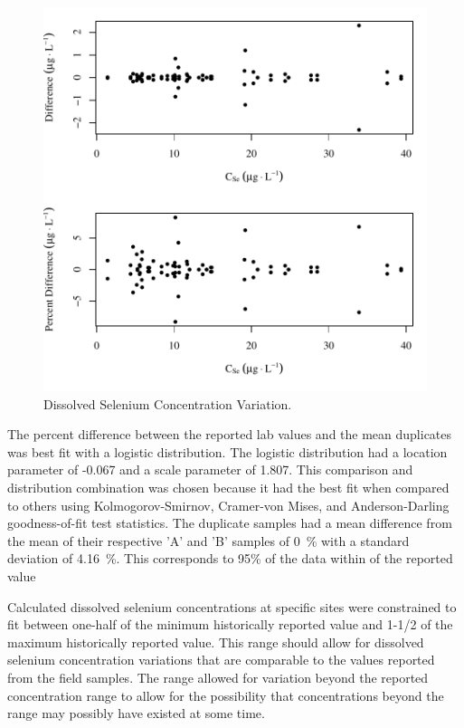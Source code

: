 \begin{linenumbers}
\begin{figure}[htbp]
	\begin{center}
		\includegraphics[width=6in]{"Figures/Results_USR/Stochastic/CSe Error Scatter"}
		\caption[Dissolved Selenium Concentration Variation]{Dissolved Selenium Concentration Variation.}
		\label{fig:CSe uncertainty scatter}
	\end{center}
\end{figure}

The percent difference between the reported lab values and the mean duplicates was best fit with a logistic distribution.  The logistic distribution had a location parameter of -0.067 and a scale parameter of 1.807.  This comparison and distribution combination was chosen because it had the best fit when compared to others using Kolmogorov-Smirnov, Cramer-von Mises, and Anderson-Darling goodness-of-fit test statistics.  The duplicate samples had a mean difference from the mean of their respective 'A' and 'B' samples of \SI{0}{\percent} with a standard deviation of \SI{4.16}{\percent}.  This corresponds to 95\% of the data within  of the reported value

Calculated dissolved selenium concentrations at specific sites were constrained to fit between one-half of the minimum historically reported value and 1-1/2 of the maximum historically reported value.  This range should allow for dissolved selenium concentration variations that are comparable to the values reported from the field samples.  The range allowed for variation beyond the reported concentration range to allow for the possibility that concentrations beyond the range may possibly have existed at some time.


\end{linenumbers}
